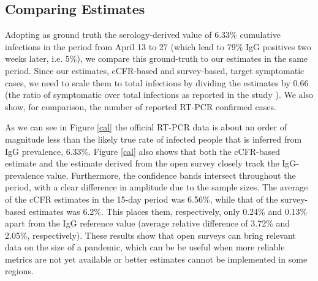 \documentclass{article}
\newcommand{\hh}[1]{{#1}}
\begin{document}
\subsection{Comparing Estimates}
\label{s-comparison}

Adopting as ground truth the serology-derived value of 6.33\% cumulative infections in the period from April 13 to 27 (which lead to 79\% IgG positives two weeks later, i.e. 5\%), we compare this ground-truth to our estimates in the same period. Since our estimates, cCFR-based and survey-based, target symptomatic cases, we need to scale them to total infections by dividing the estimates by 0.66 (the ratio of symptomatic over total infections as reported in the study \cite{ENEcovid19}). We also show, for comparison, the number of reported RT-PCR confirmed cases.

As we can see in Figure \ref{cal} the official RT-PCR data is about an order of magnitude less than the likely true rate of infected people that is inferred from IgG prevalence, 6.33\%. Figure \ref{cal} also shows that both the cCFR-based estimate and the estimate derived from the open survey closely track the IgG-prevalence value. \hh{Furthermore, the confidence bands intersect throughout the period, with a clear difference in amplitude due to the sample sizes}.  
% 
The average of the cCFR estimates in the 15-day period was 6.56\%, while that of the survey-based estimates was 6.2\%. This places them, respectively, only 0.24\% and 0.13\% apart from the IgG reference value (average relative difference of 3.72\% and 2.05\%, respectively). These results show that open surveys can bring relevant data on the size of a pandemic, which can be be useful when more reliable metrics are not yet available or better estimates cannot be implemented in some regions. 
\end{document}
